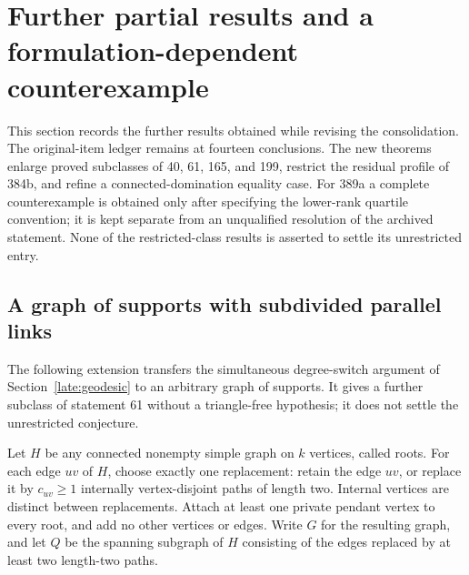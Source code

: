 \documentclass[11pt,a4paper]{article}
\theoremstyle{definition}\newtheorem{definition}[theorem]{Definition}
\theoremstyle{remark}\newtheorem{remark}[theorem]{Remark}
\begin{document}
\section{Further partial results and a formulation-dependent counterexample}
\label{revision:research}
This section records the further results obtained while revising the
consolidation. The original-item ledger remains at fourteen conclusions.
The new theorems enlarge proved subclasses of 40, 61, 165, and 199,
restrict the residual profile of 384b, and refine a connected-domination
equality case. For 389a a complete counterexample is obtained only after
specifying the lower-rank quartile convention; it is kept separate from
an unqualified resolution of the archived statement. None of the
restricted-class results is asserted to settle its unrestricted entry.

\subsection{A graph of supports with subdivided parallel links}
\label{r12support:section}
The following extension transfers the simultaneous degree-switch argument
of Section~\ref{late:geodesic} to an arbitrary graph of supports. It gives
a further subclass of statement 61 without a triangle-free hypothesis;
it does not settle the unrestricted conjecture.

Let $H$ be any connected nonempty simple graph on $k$ vertices, called
roots. For each edge $uv$ of $H$, choose exactly one replacement:
retain the edge $uv$, or replace it by $c_{uv}\ge1$ internally
vertex-disjoint paths of length two. Internal vertices are distinct
between replacements. Attach at least one private pendant vertex to
every root, and add no other vertices or edges. Write $G$ for the resulting
graph, and let $Q$ be the spanning subgraph of $H$ consisting of the
edges replaced by at least two length-two paths.
\end{document}
